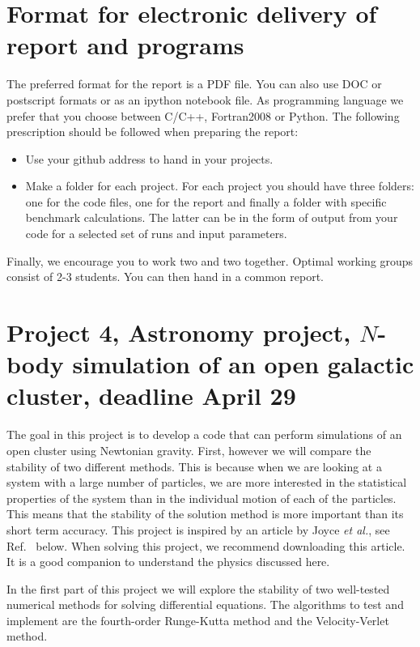 \documentclass[11pt,a4wide]{article}
\begin{document}
\section*{Format for electronic delivery of report and programs}
%
The preferred format for the report is a PDF file. You can also
use DOC or postscript formats or as an ipython notebook file. 
As programming language we prefer that you choose between C/C++, Fortran2008 or Python.
The following prescription should be followed when preparing the report:
\begin{itemize}
\item Use your github address  to hand in your projects.
\item Make a folder for each project. For each project you should have three folders: one for the code files, one for the report and finally a folder with specific benchmark calculations. The latter can be in the form of output from your code
for a selected set of runs and input parameters. 

\end{itemize}

Finally, 
we encourage you to work two and two together. Optimal working groups consist of 
2-3 students. You can then hand in a common report. 



\section*{Project 4, Astronomy project, $N$-body simulation of an open galactic cluster, deadline  April 29}




The goal in this project is to develop a code that can perform simulations of an
open cluster using Newtonian gravity. First, however we will compare
the stability of two different methods. This is because when we are
looking at a system with a large number of particles, we are more
interested in the statistical properties of the system than in the
individual motion of each of the particles. This means that the
stability of the solution method is more important than its short term
accuracy.  This project is inspired by an article by Joyce {\em et al.}, see Ref.~\cite{joyce2010} below.
When  solving this project, we recommend downloading this article. It is a good companion to understand the 
physics discussed here. 

In the first part of this project we will explore the stability of two
well-tested numerical methods for solving differential equations. The algorithms to test and implement are the fourth-order Runge-Kutta method and the Velocity-Verlet method. 
\end{document}
